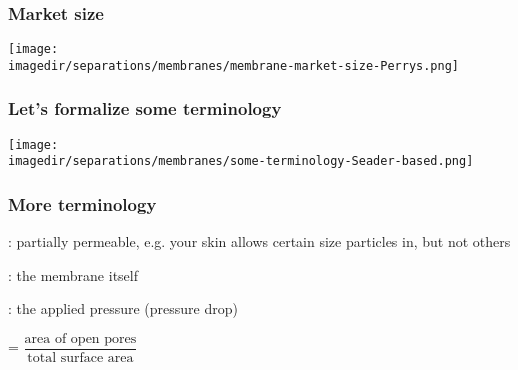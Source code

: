 \begin{frame}\frametitle{Market size}
	\begin{center}
		\texttt{[image: \\imagedir/separations/membranes/membrane-market-size-Perrys.png]}
	\end{center}
\end{frame}

\begin{frame}\frametitle{Let's formalize some terminology}

	\begin{center}
		\texttt{[image: \\imagedir/separations/membranes/some-terminology-Seader-based.png]}
	\end{center}
\end{frame}

\begin{frame}\frametitle{More terminology}

	{\color{purple}{semipermeable}}: partially permeable, e.g. your skin allows certain size particles in, but not others

	\vspace{12pt}
	{\color{purple}{mass separating agent}}: the membrane itself

	\vspace{12pt}
	{\color{purple}{energy separating agent}}: the applied pressure (pressure drop)

	\vspace{12pt}
	{\color{purple}{porosity}} = $\dfrac{\text{area of open pores}}{\text{total surface area}}$
\end{frame}

